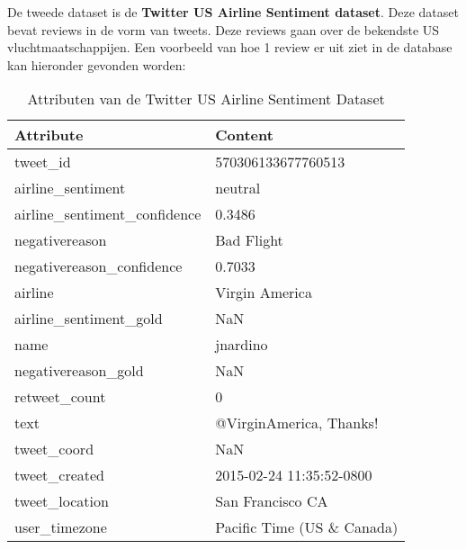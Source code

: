 De tweede dataset is de \textbf{Twitter US Airline Sentiment dataset}. Deze dataset bevat reviews in de vorm van tweets. Deze reviews gaan over de bekendste US vluchtmaatschappijen.\autocite{Kaggle2020} Een voorbeeld van hoe 1 review er uit ziet in de database kan hieronder gevonden worden:
\begin{table}[]
    \begin{tabular}{@{}|l|l|@{}}
        \toprule
        \textbf{Attribute}             & \textbf{Content}            \\ \midrule
        tweet\_id                      & 570306133677760513          \\
        airline\_sentiment             & neutral                     \\
        airline\_sentiment\_confidence & 0.3486                      \\
        negativereason                 & Bad Flight                  \\
        negativereason\_confidence     & 0.7033                      \\
        airline                        & Virgin America              \\
        airline\_sentiment\_gold       & NaN                         \\
        name                           & jnardino                    \\
        negativereason\_gold           & NaN                         \\
        retweet\_count                 & 0                           \\
        text                           & @VirginAmerica, Thanks!     \\
        tweet\_coord                   & NaN                         \\
        tweet\_created                 & 2015-02-24 11:35:52-0800    \\
        tweet\_location                & San Francisco CA            \\
        user\_timezone                 & Pacific Time (US \& Canada) \\ \bottomrule
    \end{tabular}
    \caption{Attributen van de Twitter US Airline Sentiment Dataset}
    \label{tab:twitterdataset}
\end{table}

